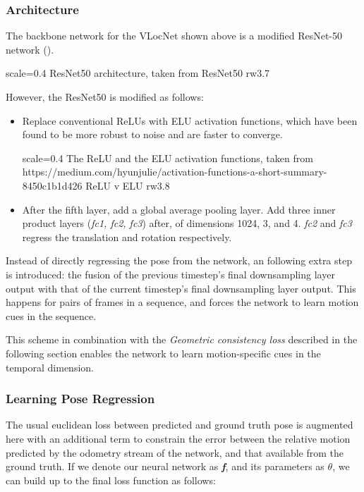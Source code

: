 \subsubsection{Architecture}
The backbone network for the VLocNet shown above is a modified ResNet-50 network (\cite{He2015}).

{scale=0.4}%
{ResNet50 architecture, taken from \cite{Mahmood2020}}%
{ResNet50}%
{rw3.7} %

However, the ResNet50 is modified as follows:

\begin{itemize}
	\item Replace conventional ReLUs with ELU activation functions, which have been found to be more robust to noise and are faster to converge.
	
    {scale=0.4}%
    {The ReLU and the ELU activation functions, taken from https://medium.com/hyunjulie/activation-functions-a-short-summary-8450c1b1d426}%
    {ReLU v ELU}%
	{rw3.8} %

	\item After the fifth layer, add a global average pooling layer. Add three inner product layers (\textit{fc1, fc2, fc3}) after, of dimensions 1024, 3, and 4.
\emph{fc2} and \emph{fc3} regress the translation and rotation respectively. 
\end{itemize}

	Instead of directly regressing the pose from the network, an following extra step is introduced: the fusion of the previous timestep's final downsampling layer output
with that of the current timestep's final downsampling layer output. This happens for pairs of frames in a sequence, and forces the network to learn motion cues in the sequence.

This scheme in combination with the \emph{Geometric consistency loss} described in the following section enables the network to learn motion-specific cues in the 
temporal dimension.

\subsubsection{Learning Pose Regression}
The usual euclidean loss between predicted and ground truth pose is augmented here with an additional term to constrain the error between the relative motion predicted
by the odometry stream of the network, and that available from the ground truth. If we denote our neural network as \textbf{\emph{f}}, and its parameters as $\theta$, we 
can build up to the final loss function as follows:

